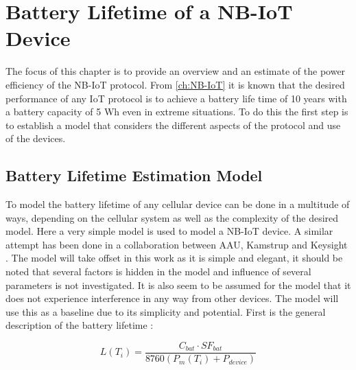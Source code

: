 \chapter{Battery Lifetime of a NB-IoT Device} \label{ch:BatTest}

The focus of this chapter is to provide an overview and an estimate of the power efficiency of the NB-IoT protocol. From \autoref{ch:NB-IoT} it is known that the desired performance of any IoT protocol is to achieve a battery life time of 10 years with a battery capacity of 5 Wh even in extreme situations. To do this the first step is to establish a model that considers the different aspects of the protocol and use of the devices.

\section{Battery Lifetime Estimation Model}
\label{sec:bat_model}

To model the battery lifetime of any cellular device can be done in a multitude of ways, depending on the cellular system as well as the complexity of the desired model. Here a very simple model is used to model a NB-IoT device. A similar attempt has been done in a collaboration between AAU, Kamstrup and Keysight \citep{Power_article}. The model will take offset in this work as it is simple and elegant, it should be noted that several factors is hidden in the model and influence of several parameters is not investigated. It is also seem to be assumed for the model that it does not experience interference in any way from other devices. The model will use this as a baseline due to its simplicity and potential. First is the general description of the battery lifetime \citep{Power_article}:

\begin{equation}
L(T_i) = \frac{C_{bat}\cdot SF_{bat}}{8760 \left(P_m(T_i) + P_{device}\right)}
\end{equation}
\begin{where}
\end{where}

